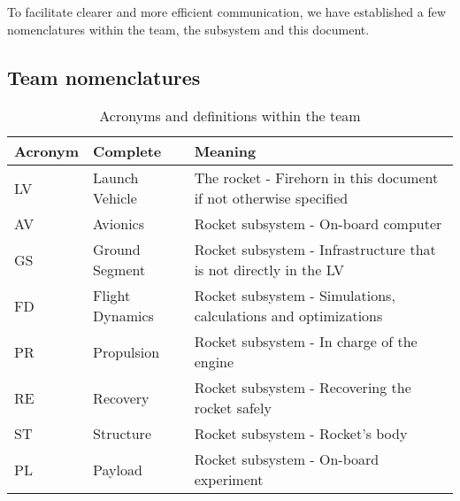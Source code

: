 To facilitate clearer and more efficient communication, 
we have established a few nomenclatures within the team, the subsystem and this document.

\subsection{Team nomenclatures}
\begin{table}[h]
   \centering
   \caption{Acronyms and definitions within the team}
   \begin{adjustbox}{width=1\textwidth}
   \begin{tabular}{|l|l|l|}
       \hline
       \textbf{Acronym} & \textbf{Complete} & \textbf{Meaning} \\
       \hline
       LV & Launch Vehicle & The rocket - Firehorn in this document if not otherwise specified \\
       AV & Avionics & Rocket subsystem - On-board computer \\
       GS & Ground Segment & Rocket subsystem - Infrastructure that is not directly in the LV \\
       FD & Flight Dynamics & Rocket subsystem - Simulations, calculations and optimizations \\
       PR & Propulsion & Rocket subsystem - In charge of the engine \\
       RE & Recovery & Rocket subsystem - Recovering the rocket safely \\
       ST & Structure & Rocket subsystem - Rocket's body \\
       PL & Payload & Rocket subsystem - On-board experiment \\
       \hline
   \end{tabular}
   \end{adjustbox}
\end{table}

